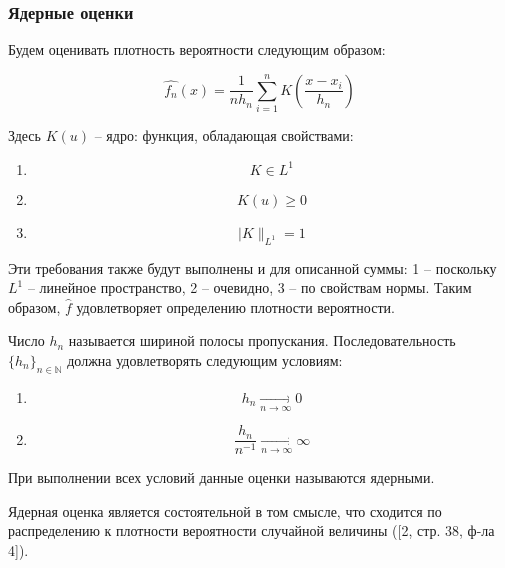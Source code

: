 \subsubsection{Ядерные оценки}

Будем оценивать плотность вероятности следующим образом:

\begin{equation}
\hat{f_n}(x) = \displaystyle \frac{1}{nh_n}\sum_{i=1}^{n}{K\left(\frac{x - x_i}{h_n}\right)}
\end{equation}

Здесь $K(u)$ -- ядро: функция, обладающая свойствами:
\begin{enumerate}
	\item \begin{equation}K \in L^1 \end{equation}
	\item \begin{equation}K(u) \geq 0 \end{equation}   
	\item \begin{equation}|K\|_{L^1}=1\end{equation} \label{kde_norm}
\end{enumerate}

Эти требования также будут выполнены и для описанной суммы: 1 -- поскольку $L^1$ -- линейное пространство, 2 -- очевидно, 3 -- по свойствам нормы. Таким образом, $\hat{f}$ удовлетворяет определению плотности вероятности.

Число $h_n$ называется шириной полосы пропускания.
Последовательность $\{h_n\}_{n \in \mathbb{N}}$ должна удовлетворять следующим условиям:
\begin{enumerate}
\item 
	\begin{equation}
	h_n \underset{n \rightarrow \infty}{\longrightarrow} 0
	\end{equation}
\item 
	\begin{equation}
	\frac{h_n}{n^{-1}} \underset{n \rightarrow \infty}{\longrightarrow} \infty
	\end{equation}
\end{enumerate}

При выполнении всех условий данные оценки называются ядерными.

Ядерная оценка является состоятельной в том смысле, что сходится по распределению к плотности вероятности случайной величины ([2, стр. 38, ф-ла 4]).

